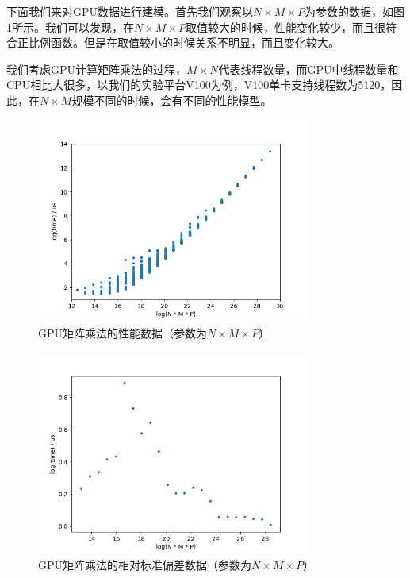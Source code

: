     下面我们来对GPU数据进行建模。首先我们观察以$ N \times M \times P $为参数的数据，如图\ref{fig:matmul_gpu_nmp}所示。我们可以发现，在$ N \times M \times P $取值较大的时候，性能变化较少，而且很符合正比例函数。但是在取值较小的时候关系不明显，而且变化较大。
    
    我们考虑GPU计算矩阵乘法的过程，$ M \times N $代表线程数量，而GPU中线程数量和CPU相比大很多，以我们的实验平台V100为例，V100单卡支持线程数为5120，因此，在$ N \times M$规模不同的时候，会有不同的性能模型。
    
    \begin{figure}[!htbp]
        \centering
        \includegraphics[width=0.8\textwidth]{figures/matmul_gpu_nmp.png}
        \caption{GPU矩阵乘法的性能数据（参数为$N \times M \times P $）}
        \label{fig:matmul_gpu_nmp}
    \end{figure}

    \begin{figure}[!htbp]
        \centering
        \includegraphics[width=0.8\textwidth]{figures/matmul_gpu_nmp_rsd.png}
        \caption{GPU矩阵乘法的相对标准偏差数据（参数为$ N \times M \times P $）}
        \label{fig:matmul_gpu_nmp_rsd}
    \end{figure}
    
